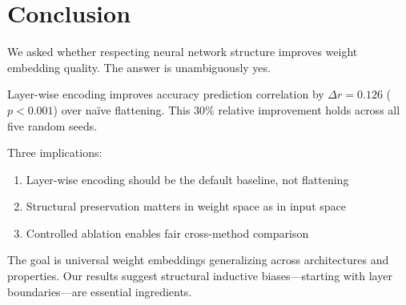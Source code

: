 \section{Conclusion}

We asked whether respecting neural network structure improves weight embedding quality. The answer is unambiguously yes.

Layer-wise encoding improves accuracy prediction correlation by $\Delta r = 0.126$ ($p < 0.001$) over na\"ive flattening. This 30\% relative improvement holds across all five random seeds.

Three implications:
\begin{enumerate}
    \item Layer-wise encoding should be the default baseline, not flattening
    \item Structural preservation matters in weight space as in input space
    \item Controlled ablation enables fair cross-method comparison
\end{enumerate}

The goal is universal weight embeddings generalizing across architectures and properties. Our results suggest structural inductive biases---starting with layer boundaries---are essential ingredients.
